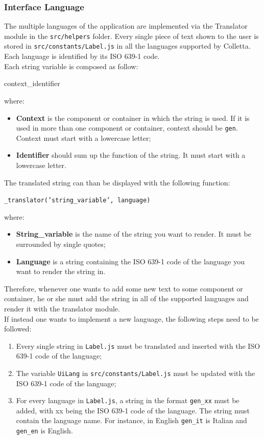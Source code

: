 \subsubsection{Interface Language}
The multiple languages of the application are implemented via the Translator module in the \texttt{src/helpers} folder. Every single piece of text shown to the user is stored in \texttt{src/constants/Label.js} in all the languages supported by Colletta. Each language is identified by its ISO 639-1 code.\\
Each string variable is composed as follow:
\begin{center}
context\_identifier
\end{center}
where:
\begin{itemize}
\item \textbf{Context} is the component or container in which the string is used. If it is used in more than one component or container, context should be \texttt{gen}. Context must start with a lowercase letter;
\item \textbf{Identifier} should sum up the function of the string. It must start with a lowercase letter.
\end{itemize}
The translated string can than be displayed with the following function:
\begin{center}
\texttt{\_translator('string\_variable', language)}
\end{center}
where:
\begin{itemize}
\item \textbf{String\_variable} is the name of the string you want to render. It must be surrounded by single quotes;
\item \textbf{Language} is a string containing the ISO 639-1 code of the language you want to render the string in.
\end{itemize}
Therefore, whenever one wants to add some new text to some component or container, he or she must add the string in all of the supported languages and render it with the translator module.\\
If instead one wants to implement a new language, the following steps need to be followed:
\begin{enumerate}
\item Every single string in \texttt{Label.js} must be translated and inserted with the ISO 639-1 code of the language;
\item The variable \texttt{UiLang} in \texttt{src/constants/Label.js} must be updated with the ISO 639-1 code of the language;
\item For every language in \texttt{Label.js}, a string in the format \texttt{gen\_xx} must be added, with xx being the ISO 639-1 code of the language. The string must contain the language name. For instance, in English \texttt{gen\_it} is Italian and \texttt{gen\_en} is English.
\end{enumerate}
